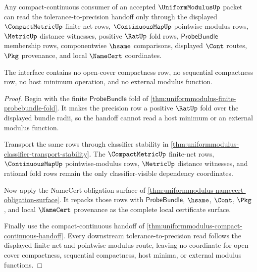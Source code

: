 \begin{theorem}
\label{thm:uniformmodulus-scoped-dependency-interface}
Any compact-continuous consumer of an accepted $\UniformModulusUp$ packet can read the tolerance-to-precision handoff only through the displayed $\CompactMetricUp$ finite-net rows, $\ContinuousMapUp$ pointwise-modulus rows, $\MetricUp$ distance witnesses, positive $\RatUp$ fold rows, $\mathsf{ProbeBundle}$ membership rows, componentwise $\hsame$ comparisons, displayed $\Cont$ routes, $\Pkg$ provenance, and local $\NameCert$ coordinates.

The interface contains no open-cover compactness row, no sequential compactness row, no host minimum operation, and no external modulus function.
\end{theorem}
\begin{proof}
Begin with the finite $\mathsf{ProbeBundle}$ fold of \autoref{thm:uniformmodulus-finite-probebundle-fold}. It makes the precision row a positive $\RatUp$ fold over the displayed bundle radii, so the handoff cannot read a host minimum or an external modulus function.

Transport the same rows through classifier stability in \autoref{thm:uniformmodulus-classifier-transport-stability}. The $\CompactMetricUp$ finite-net rows, $\ContinuousMapUp$ pointwise-modulus rows, $\MetricUp$ distance witnesses, and rational fold rows remain the only classifier-visible dependency coordinates.

Now apply the NameCert obligation surface of \autoref{thm:uniformmodulus-namecert-obligation-surface}. It repacks those rows with $\mathsf{ProbeBundle}$, $\hsame$, $\Cont$, $\Pkg$, and local $\NameCert$ provenance as the complete local certificate surface.

Finally use the compact-continuous handoff of \autoref{thm:uniformmodulus-compact-continuous-handoff}. Every downstream tolerance-to-precision read follows the displayed finite-net and pointwise-modulus route, leaving no coordinate for open-cover compactness, sequential compactness, host minima, or external modulus functions.
\end{proof}

